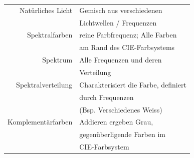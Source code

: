 \begin{tabular}{r|l}
    Natürliches Licht  & Gemisch aus verschiedenen \\
                       & Lichtwellen / Frequenzen \\
    Spektralfarben     & reine Farbfrequenz; Alle Farben \\
                       & am Rand des CIE-Farbsystems \\
    Spektrum           & Alle Frequenzen und deren \\
                       & Verteilung \\
    Spektralverteilung & Charakterisiert die Farbe, definiert \\
                       & durch Frequenzen \\
                       & (Bsp. Verschiedenes Weiss) \\
    Komplementärfarben & Addieren ergeben Grau, \\
                       & gegenüberligende Farben im \\
                       & CIE-Farbsystem
\end{tabular}
